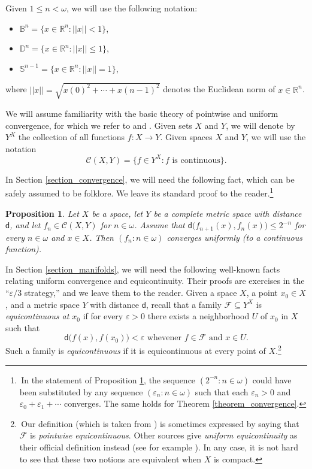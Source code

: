 \documentclass{amsart}
\theoremstyle{plain}
\newtheorem{proposition}[theorem]{Proposition}
\theoremstyle{definition}
\newcommand{\di}{\mathsf{d}}
\newcommand{\CC}{\mathcal{C}}
\newcommand{\FF}{\mathcal{F}}
\newcommand{\BBB}{\mathbb{B}}
\newcommand{\DDD}{\mathbb{D}}
\newcommand{\RRR}{\mathbb{R}}
\newcommand{\SSS}{\mathbb{S}}
\begin{document}
Given $1\leq n<\omega$, we will use the following notation:
\begin{itemize}
\item $\BBB^n=\{x\in\RRR^n:||x||<1\}$,
\item $\DDD^n=\{x\in\RRR^n:||x||\leq 1\}$,
\item $\SSS^{n-1}=\{x\in\RRR^n:||x||=1\}$,
\end{itemize}
where $||x||=\sqrt{x(0)^2+\cdots +x(n-1)^2}$ denotes the Euclidean norm of $x\in\RRR^n$.

We will assume familiarity with the basic theory of pointwise and uniform convergence, for which we refer to \cite[Section 1.3]{van_mill_book} and \cite[Chapter 7]{munkres}. Given sets $X$ and $Y$, we will denote by $Y^X$ the collection of all functions $f:X\longrightarrow Y$. Given spaces $X$ and $Y$, we will use the notation
$$
\CC(X,Y)=\{f\in Y^X:f\text{ is continuous}\}.
$$

In Section \ref{section_convergence}, we will need the following fact, which can be safely assumed to be folklore. We leave its standard proof to the reader.\footnote{\,In the statement of Proposition \ref{proposition_convergence}, the sequence $(2^{-n}:n\in\omega)$ could have been substituted by any sequence $(\varepsilon_n:n\in\omega)$ such that each $\varepsilon_n >0$ and $\varepsilon_0 +\varepsilon_1 +\cdots$ converges. The same holds for Theorem \ref{theorem_convergence}.}

\begin{proposition}\label{proposition_convergence}
Let $X$ be a space, let $Y$ be a complete metric space with distance~$\di$, and let $f_n\in\CC(X,Y)$ for $n\in\omega$. Assume that $\di\big(f_{n+1}(x),f_n(x)\big)\leq 2^{-n}$ for every $n\in\omega$ and $x\in X$. Then $(f_n:n\in\omega)$ converges uniformly (to a continuous function).
\end{proposition}

In Section \ref{section_manifolds}, we will need the following well-known facts relating uniform convergence and equicontinuity. Their proofs are exercises in the ``$\varepsilon/3$ strategy,'' and we leave them to the reader. Given a space $X$, a point $x_0\in X$, and a metric space $Y$ with distance $\di$, recall that a family $\FF\subseteq Y^X$ is \emph{equicontinuous at $x_0$} if for every $\varepsilon>0$ there exists a neighborhood $U$ of $x_0$ in $X$ such that
$$
\di\big(f(x),f(x_0)\big)<\varepsilon\text{  whevener }f\in\FF\text{ and }x\in U.
$$
Such a family is \emph{equicontinuous} if it is equicontinuous at every point of $X$.\footnote{\,Our definition (which is taken from \cite[page 276]{munkres}) is sometimes expressed by saying that $\FF$ is \emph{pointwise equicontinuous}. Other sources give \emph{uniform equicontinuity} as their official definition instead (see for example \cite[Definition 7.22]{rudin}). In any case, it is not hard to see that these two notions are equivalent when $X$ is compact.}
\end{document}
